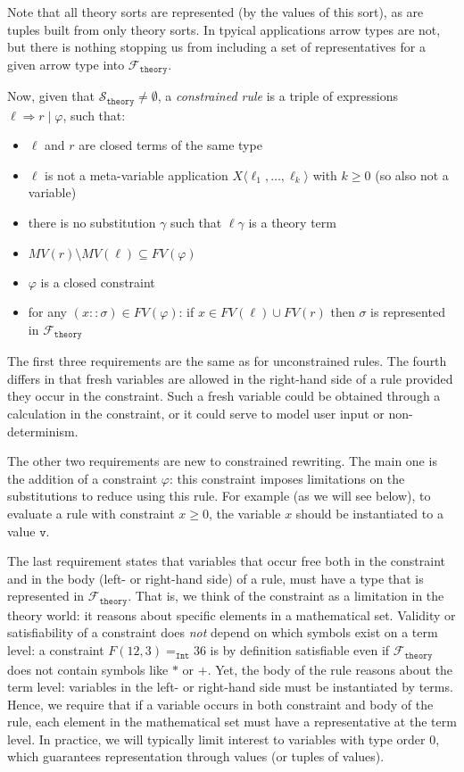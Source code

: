 \documentclass{lmcs}
\theoremstyle{theorem}\newtheorem{theorem}{Theorem}
\theoremstyle{theorem}\newtheorem{lemma}[theorem]{Lemma}
\theoremstyle{theorem}\newtheorem{corollary}[theorem]{Corollary}
\theoremstyle{definition}\newtheorem{definition}[theorem]{Definition}
\theoremstyle{definition}\newtheorem{example}[theorem]{Example}
\newcommand{\thF}{\mathcal{F}_{\mathtt{theory}}}
\newcommand{\thSorts}{\mathcal{S}_{\mathtt{theory}}}
\newcommand{\FV}{\mathit{FV}}
\newcommand{\FMV}{\mathit{MV}}
\newcommand{\atype}{\sigma}
\newcommand{\identifier}[1]{\mathtt{#1}}
\newcommand{\avalue}{\identifier{v}}
\newcommand{\avar}{x}
\newcommand{\Avar}{X}
\newcommand{\meta}[2]{#1\langle#2\rangle}
\newcommand{\arrz}{\Rightarrow}
\newcommand{\symb}[1]{\mathtt{#1}}
\newcommand{\tint}{\symb{Int}}
\begin{document}
Note that all theory sorts are represented (by the values of this sort), as are
tuples built from only theory sorts.  In tpyical applications arrow types are
not, but there is nothing stopping us from including a set of representatives
for a given arrow type into $\thF$.

Now, given that $\thSorts \neq \emptyset$,
a \emph{constrained rule} is a triple of expressions $\ell \arrz r \mid
\varphi$, such that:
\begin{itemize}
\item $\ell$ and $r$ are closed terms of the same type
\item $\ell$ is not a meta-variable application $\meta{\Avar}{\ell_1,\dots,
  \ell_k}$ with $k \geq 0$ (so also not a variable)
\item there is no substitution $\gamma$ such that $\ell\gamma$ is a theory term
\item $\FMV(r) \setminus \FMV(\ell) \subseteq \FV(\varphi)$
\item $\varphi$ is a closed constraint
\item for any $(\avar :: \atype) \in \FV(\varphi)$:
  if $\avar \in \FV(\ell) \cup \FV(r)$ then $\atype$ is represented in
  $\thF$
\end{itemize}

The first three requirements are the same as for unconstrained rules.  The
fourth differs in that fresh variables are allowed in the right-hand side of a
rule provided they occur in the constraint.  Such a fresh variable could be
obtained through a calculation in the constraint, or it could serve to model
user input or non-determinism.

The other two requirements are new to constrained rewriting.  The main one is
the addition of a constraint $\varphi$: this constraint imposes limitations on
the substitutions to reduce using this rule.  For example (as we will see
below), to evaluate a rule with constraint $\avar \geq 0$, the variable
$\avar$ should be instantiated to a value $\avalue$.

The last requirement states that variables that occur free both in the
constraint and in the body (left- or right-hand side) of a rule, must have a
type that is represented in $\thF$.  That is, we think of the constraint as a
limitation in the theory world: it reasons about specific elements in a
mathematical set.  Validity or satisfiability of a constraint does \emph{not}
depend on which symbols exist on a term level: a constraint $F(12,3) =_\tint
36$ is by definition satisfiable even if $\thF$ does not contain symbols like
$*$ or $+$.  Yet, the body of the rule reasons about the term level: variables
in the left- or right-hand side must be instantiated by terms.  Hence, we
require that if a variable occurs in both constraint and body of the rule,
each element in the mathematical set must have a representative at the term
level.
In practice, we will typically limit interest to variables with type order $0$,
which guarantees representation through values (or tuples of values).
\end{document}
